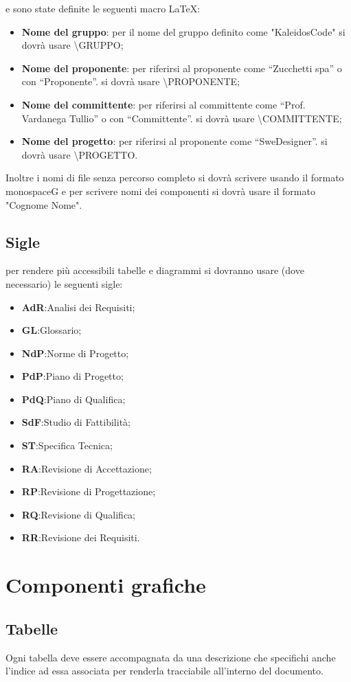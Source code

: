 \documentclass[a4paper]{report}
\begin{document}
	e sono state definite le seguenti macro \LaTeX:
	\begin{itemize}
		\item \textbf{Nome del gruppo}: per il nome del gruppo definito come "KaleidosCode" si dovrà usare \textbackslash GRUPPO;
		\item \textbf{Nome del proponente}: per riferirsi al proponente come “Zucchetti spa” o con “Proponente”. si dovrà usare \textbackslash PROPONENTE;	
		\item \textbf{Nome del committente}: per riferirsi al committente come “Prof. Vardanega Tullio” o con “Committente”. si dovrà usare \textbackslash COMMITTENTE;
		\item \textbf{Nome del progetto}: per riferirsi al proponente come “SweDesigner”. si dovrà usare \textbackslash PROGETTO.
	\end{itemize}
	Inoltre i nomi di file senza percorso completo si dovrà scrivere usando il formato monospace\ped G e per scrivere nomi dei componenti si dovrà usare il formato "Cognome Nome". 
	
	
	\subsection{Sigle}
	per rendere più accessibili tabelle e diagrammi si dovranno usare (dove 
	necessario) le seguenti sigle:
	\begin{itemize}
		\item \textbf{AdR}:Analisi dei Requisiti;
		\item \textbf{GL}:Glossario;
		\item \textbf{NdP}:Norme di Progetto;
		\item \textbf{PdP}:Piano di Progetto;
		\item \textbf{PdQ}:Piano di Qualifica;
		\item \textbf{SdF}:Studio di Fattibilità;
		\item \textbf{ST}:Specifica Tecnica;
		\item \textbf{RA}:Revisione di Accettazione;
		\item \textbf{RP}:Revisione di Progettazione;
		\item \textbf{RQ}:Revisione di Qualifica;
		\item \textbf{RR}:Revisione dei Requisiti.
	\end{itemize}
	\section{Componenti grafiche}
	\subsection{Tabelle}
	Ogni tabella deve essere accompagnata da una descrizione che specifichi anche l'indice ad essa associata per renderla tracciabile all'interno del documento.
\end{document}
